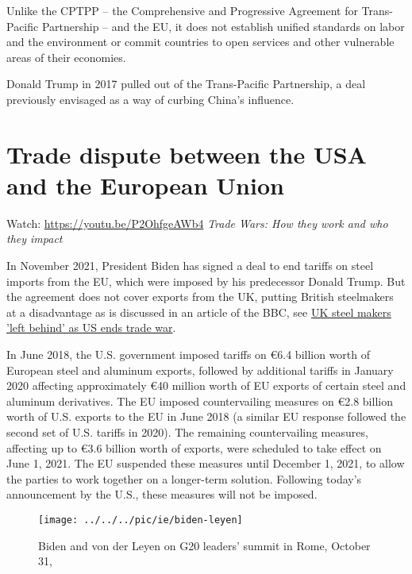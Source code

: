 Unlike the CPTPP -- the Comprehensive and Progressive Agreement for Trans-Pacific Partnership -- and the EU, it does not establish unified standards on labor and the environment or commit countries to open services and other vulnerable areas of their economies.

Donald Trump in 2017 pulled out of the Trans-Pacific Partnership, a deal previously envisaged as a way of curbing China’s influence.

\pbn
\section{Trade dispute between the USA and the European Union}

\tv Watch: \url{https://youtu.be/P2OhfgeAWb4} \textit{Trade Wars: How they work and who they impact}


In November 2021, President Biden has signed a deal to end tariffs on steel imports from the EU, which were imposed by his predecessor Donald Trump. But the agreement does not cover exports from the UK, putting British steelmakers at a disadvantage as is discussed in an article of the BBC, see \href{https://www.bbc.com/news/business-59113868}{UK steel makers 'left behind' as US ends trade war}.

In June 2018, the U.S. government imposed tariffs on \euro 6.4 billion worth of European steel and aluminum exports, followed by additional tariffs in January 2020 affecting approximately \euro  40 million worth of EU exports of certain steel and aluminum derivatives. The EU imposed countervailing measures on \euro 2.8 billion worth of U.S. exports to the EU in June 2018 (a similar EU response followed the second set of U.S. tariffs in 2020). The remaining countervailing measures, affecting up to \euro 3.6 billion worth of exports, were scheduled to take effect on June 1, 2021. The EU suspended these measures until December 1, 2021, to allow the parties to work together on a longer-term solution. Following today's announcement by the U.S., these measures will not be imposed.\citep{EuropeanCommission2021EU}



\begin{figure}[H]
	\begin{center}
		\texttt{[image: ../../../pic/ie/biden-leyen]}
	\end{center}
	\caption{Biden and von der Leyen on G20 leaders' summit in Rome, October 31,}
\end{figure}

